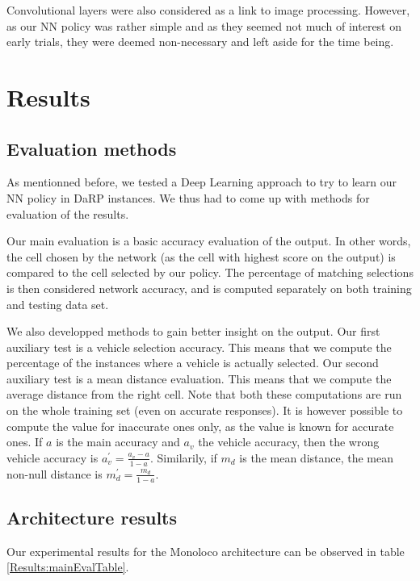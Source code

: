 \documentclass{article}
\begin{document}
Convolutional layers were also considered as a link to image processing.
However, as our NN policy was rather simple and as they seemed not much of interest on early trials, they were deemed non-necessary and left aside for the time being.

\section{Results}
\subsection{Evaluation methods}

As mentionned before, we tested a Deep Learning approach to try to learn our NN policy in DaRP instances.
We thus had to come up with methods for evaluation of the results.

Our main evaluation is a basic accuracy evaluation of the output.
In other words, the cell chosen by the network (as the cell with highest score on the output) is compared to the cell selected by our policy.
The percentage of matching selections is then considered network accuracy, 
and is computed separately on both training and testing data set.

We also developped methods to gain better insight on the output.
Our first auxiliary test is a vehicle selection accuracy.
This means that we compute the percentage of the instances where a vehicle is actually selected.
Our second auxiliary test is a mean distance evaluation.
This means that we compute the average distance from the right cell.
Note that both these computations are run on the whole training set (even on accurate responses).
It is however possible to compute the value for inaccurate ones only,
as the value is known for accurate ones.
If $a$ is the main accuracy and $a_v$ the vehicle accuracy, 
then the wrong vehicle accuracy is $a^\prime_v = \frac{a_v-a}{1-a}$.
Similarily, if $m_d$ is the mean distance, the mean non-null distance is $m^\prime_d = \frac{m_d}{1-a}$.

\subsection{Architecture results}

Our experimental results for the Monoloco architecture can be observed in table \ref{Results:mainEvalTable}.
\end{document}
